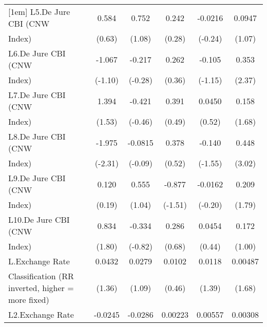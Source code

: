 {\begin{tabular}{l*{5}{c}}
[1em]
L5.De Jure CBI (CNW &       0.584         &       0.752         &       0.242         &     -0.0216         &      0.0947         \\
Index)              &      (0.63)         &      (1.08)         &      (0.28)         &     (-0.24)         &      (1.07)         \\
[1em]
L6.De Jure CBI (CNW &      -1.067         &      -0.217         &       0.262         &      -0.105         &       0.353\sym{*}  \\
Index)              &     (-1.10)         &     (-0.28)         &      (0.36)         &     (-1.15)         &      (2.37)         \\
[1em]
L7.De Jure CBI (CNW &       1.394         &      -0.421         &       0.391         &      0.0450         &       0.158         \\
Index)              &      (1.53)         &     (-0.46)         &      (0.49)         &      (0.52)         &      (1.68)         \\
[1em]
L8.De Jure CBI (CNW &      -1.975\sym{*}  &     -0.0815         &       0.378         &      -0.140         &       0.448\sym{**} \\
Index)              &     (-2.31)         &     (-0.09)         &      (0.52)         &     (-1.55)         &      (3.02)         \\
[1em]
L9.De Jure CBI (CNW &       0.120         &       0.555         &      -0.877         &     -0.0162         &       0.209         \\
Index)              &      (0.19)         &      (1.04)         &     (-1.51)         &     (-0.20)         &      (1.79)         \\
[1em]
L10.De Jure CBI (CNW&       0.834         &      -0.334         &       0.286         &      0.0454         &       0.172         \\
Index)              &      (1.80)         &     (-0.82)         &      (0.68)         &      (0.44)         &      (1.00)         \\
[1em]
L.Exchange Rate     &      0.0432         &      0.0279         &      0.0102         &      0.0118         &     0.00487         \\
Classification (RR inverted, higher = more fixed)&      (1.36)         &      (1.09)         &      (0.46)         &      (1.39)         &      (1.68)         \\
[1em]
L2.Exchange Rate    &     -0.0245         &     -0.0286         &     0.00223         &     0.00557         &     0.00308         \\

\end{tabular}}
